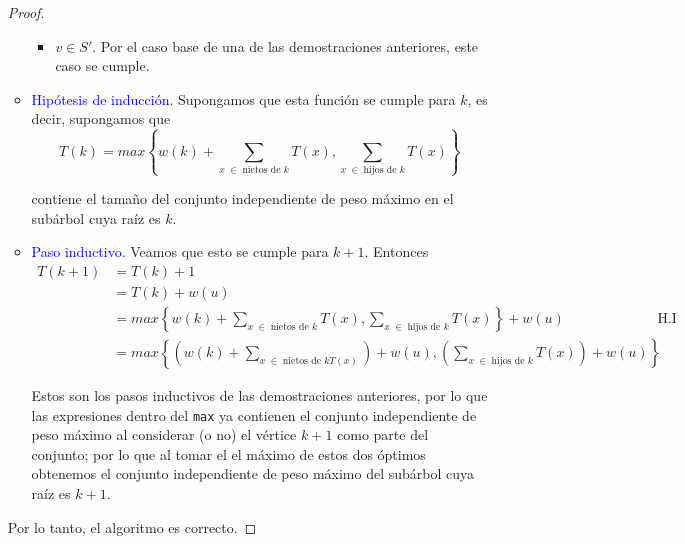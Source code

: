 \documentclass[letterpaper,11pt]{article}
\begin{document}
\begin{enumerate}
\begin{proof}
\begin{itemize}
\begin{itemize}
                \item $v \in S'$. Por el caso base de una de las demostraciones
                anteriores, este caso se cumple.
            \end{itemize}

            \item \textcolor{blue}{Hipótesis de inducción}. Supongamos que 
            esta función se cumple para $k$, es decir, supongamos que 
            \begin{equation*}
                T(k) = max \left\{w(k) + \sum_{x \; \in \;
                \text{nietos de $k$}} T(x), \sum_{x \; \in \; 
                \text{hijos de $k$}} T(x) \right\} 
            \end{equation*}

            contiene el tamaño del conjunto independiente de peso máximo en 
            el subárbol cuya raíz es $k$.

            \item \textcolor{blue}{Paso inductivo}. Veamos que esto se cumple 
            para $k+1$. Entonces 
            \begin{align*}
                T(k+1) 
                &= T(k) + 1 \\
                &= T(k) + w(u) \\ 
                &= max \left\{w(k) + \sum_{x \; \in \; \text{nietos de $k$}} 
                T(x), \sum_{x \; \in \; \text{hijos de $k$}} T(x) \right\}
                + w(u)
                && \text{H.I} \\
                &= max \left\{
                    \left(w(k) + \sum_{x \; \in \; \text{nietos de $k$} T(x)} 
                    \right) + w(u), 
                    \left(\sum_{x \; \in \; \text{hijos de $k$}} T(x) \right)
                    + w(u) \right\}
            \end{align*}

            Estos son los pasos inductivos de las demostraciones anteriores, 
            por lo que las expresiones dentro del \texttt{max} ya contienen 
            el conjunto independiente de peso máximo al considerar (o no) el 
            vértice $k+1$ como parte del conjunto; por lo que al tomar el 
            el máximo de estos dos óptimos obtenemos el conjunto independiente
            de peso máximo del subárbol cuya raíz es $k+1$.
        \end{itemize}

        Por lo tanto, el algoritmo es correcto.


\end{proof}
\end{enumerate}
\end{document}
